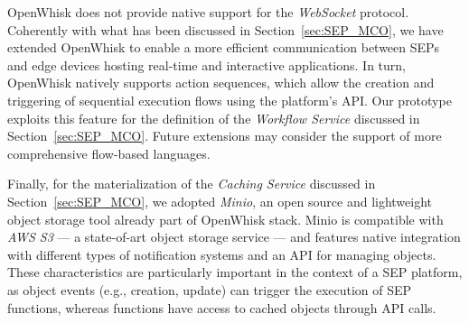 OpenWhisk does not provide native support for the \textit{WebSocket} protocol. Coherently with what has been discussed in Section~\ref{sec:SEP_MCO}, we have extended OpenWhisk to enable a more efficient communication between SEPs and edge devices hosting real-time and interactive applications. 
In turn, OpenWhisk natively supports action sequences, which allow the creation and triggering of sequential execution flows using the platform's API. Our prototype exploits this feature for the definition of the \textit{Workflow Service} discussed in Section~\ref{sec:SEP_MCO}. Future extensions may consider the support of more comprehensive flow-based languages. %



Finally, for the materialization of the \textit{Caching Service} discussed in Section~\ref{sec:SEP_MCO}, we adopted \textit{Minio}, an open source and lightweight object storage tool already part of OpenWhisk stack.
Minio is compatible with \textit{AWS S3} --- a state-of-art object storage service --- and features native integration with different types of notification systems and an API for managing objects. These characteristics are particularly important in the context of a SEP platform, as object events (e.g., creation, update) can trigger the execution of SEP functions, whereas functions have access to cached objects through API calls. 



